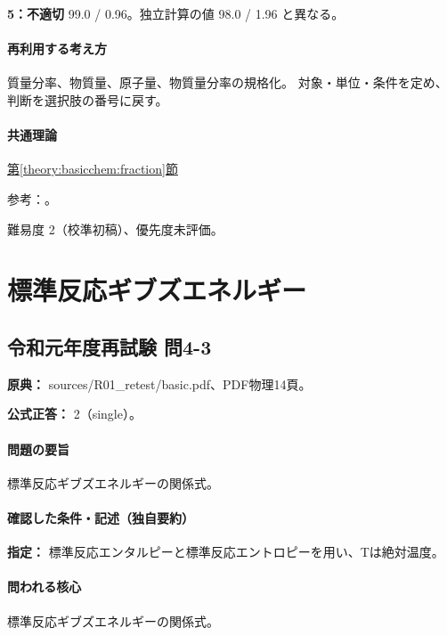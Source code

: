 \noindent\textbf{5：不適切} 99.0 / 0.96。独立計算の値 98.0 / 1.96 と異なる。\par

\paragraph{再利用する考え方} 質量分率、物質量、原子量、物質量分率の規格化。 対象・単位・条件を定め、判断を選択肢の番号に戻す。

\paragraph{共通理論} \hyperref[theory:basicchem:fraction]{第\ref*{theory:basicchem:fraction}節}

\par 参考：\cite{iupac_amount_fraction}。

\par 難易度 2（校準初稿）、優先度未評価。

\section{標準反応ギブズエネルギー}

\subsection{令和元年度再試験 問4-3}
\label{q:r01-ret-basic-4-3}

\noindent\textbf{原典：} sources/R01\_retest/basic.pdf、PDF物理14頁。

\textbf{公式正答：} 2（single）。

\paragraph{問題の要旨} 標準反応ギブズエネルギーの関係式。

\paragraph{確認した条件・記述（独自要約）}\mbox{}\par

\noindent\textbf{指定：} 標準反応エンタルピーと標準反応エントロピーを用い、Tは絶対温度。\par

\paragraph{問われる核心} 標準反応ギブズエネルギーの関係式。

